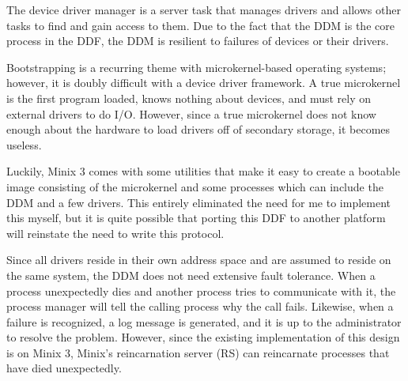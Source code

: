 
The device driver manager is a server task that manages
drivers and allows other tasks to find and gain access to them.
Due to the fact that the DDM is the core process in the DDF, the DDM is
resilient to failures of devices or their drivers.


Bootstrapping is a recurring theme with microkernel-based operating systems;
however, it is doubly difficult with a device driver framework.
A true microkernel is the first program
loaded, knows nothing about devices, and must rely on external drivers to do
I/O.  However, since a true microkernel does not know enough about the
hardware to load drivers off of secondary storage, it becomes useless.

Luckily, Minix 3 comes with some utilities that make it easy to create a
bootable image consisting of the microkernel and some processes which can
include the DDM and a few drivers.  This entirely eliminated the need for
me to implement this myself, but it is quite possible that porting this DDF
to another platform will reinstate the need to write this protocol.


Since all drivers reside in their own address space and are assumed to
reside on the same system, the DDM does not need extensive fault tolerance.
When a process unexpectedly dies and another process tries to communicate
with it, the process manager will tell the calling process why the call
fails.  Likewise, when a failure is recognized, a log message is generated,
and it is up to the administrator to resolve the problem.  However, since
the existing implementation of this design is on Minix 3, Minix's
reincarnation server (RS) can reincarnate processes that have died
unexpectedly.
